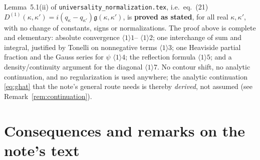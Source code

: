 \documentclass[11pt]{article}
\newcommand{\gfr}{\mathfrak g}\newcommand{\Dt}{\widetilde D^{(1)}}\newcommand{\psih}{\psi}
\begin{document}

\begin{verdictok}
Lemma~5.1(ii) of \texttt{universality\_normalization.tex}, i.e.\ eq.~(21)
\(D^{(1)}(\kappa,\kappa')=i(q_\kappa-q_{\kappa'})\gfr(\kappa,\kappa')\), is \textbf{proved as
stated}, for all real \(\kappa,\kappa'\), with no change of constants, signs or normalizations.  The
proof above is complete and elementary: absolute convergence \(\langle1\rangle1\)--%
\(\langle1\rangle2\); one interchange of sum and integral, justified by Tonelli on nonnegative terms
\(\langle1\rangle3\); one Heaviside partial fraction and the Gauss series for \(\psi\)
\(\langle1\rangle4\); the reflection formula \(\langle1\rangle5\); and a density/continuity argument
for the diagonal \(\langle1\rangle7\).  No contour shift, no analytic continuation, and no
regularization is used anywhere; the analytic continuation \eqref{eq:ghat} that the note's general
route needs is thereby \emph{derived}, not assumed (see Remark~\ref{rem:continuation}).
\end{verdictok}

\section{Consequences and remarks on the note's text}\label{sec:remarks}
\end{document}
